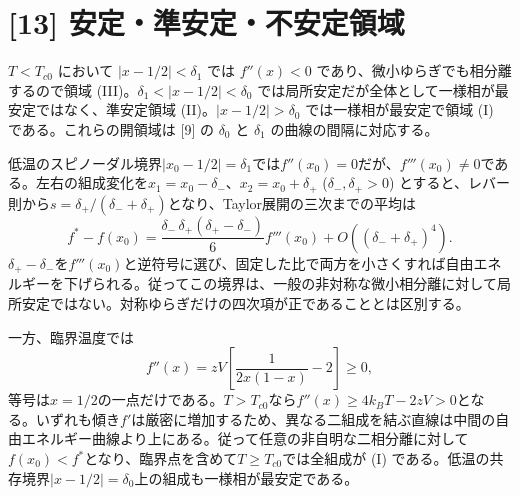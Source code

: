 \documentclass[11pt,a4paper]{article}
\begin{document}
\section*{[13] 安定・準安定・不安定領域}
$T<T_{c0}$ において $|x-1/2|<\delta_1$ では $f''(x)<0$ であり、微小ゆらぎでも相分離するので領域 (III)。$\delta_1<|x-1/2|<\delta_0$ では局所安定だが全体として一様相が最安定ではなく、準安定領域 (II)。$|x-1/2|>\delta_0$ では一様相が最安定で領域 (I) である。これらの開領域は [9] の $\delta_0$ と $\delta_1$ の曲線の間隔に対応する。

低温のスピノーダル境界$|x_0-1/2|=\delta_1$では$f''(x_0)=0$だが、$f'''(x_0)\ne0$である。左右の組成変化を$x_1=x_0-\delta_-$、$x_2=x_0+\delta_+$ ($\delta_-,\delta_+>0$) とすると、レバー則から$s=\delta_+/(\delta_-+\delta_+)$となり、Taylor展開の三次までの平均は
\begin{equation}
 f^*-f(x_0)=\frac{\delta_-\,\delta_+(\delta_+-\delta_-)}6f'''(x_0)
 +O\!\left((\delta_-+\delta_+)^4\right).
\end{equation}
$\delta_+-\delta_-$を$f'''(x_0)$と逆符号に選び、固定した比で両方を小さくすれば自由エネルギーを下げられる。従ってこの境界は、一般の非対称な微小相分離に対して局所安定ではない。対称ゆらぎだけの四次項が正であることとは区別する。

一方、臨界温度では
\begin{equation}
 f''(x)=zV\left[\frac1{2x(1-x)}-2\right]\ge0,
\end{equation}
等号は$x=1/2$の一点だけである。$T>T_{c0}$なら$f''(x)\ge4k_BT-2zV>0$となる。いずれも傾き$f'$は厳密に増加するため、異なる二組成を結ぶ直線は中間の自由エネルギー曲線より上にある。従って任意の非自明な二相分離に対して$f(x_0)<f^*$となり、臨界点を含めて$T\ge T_{c0}$では全組成が (I) である。低温の共存境界$|x-1/2|=\delta_0$上の組成も一様相が最安定である。
\end{document}
